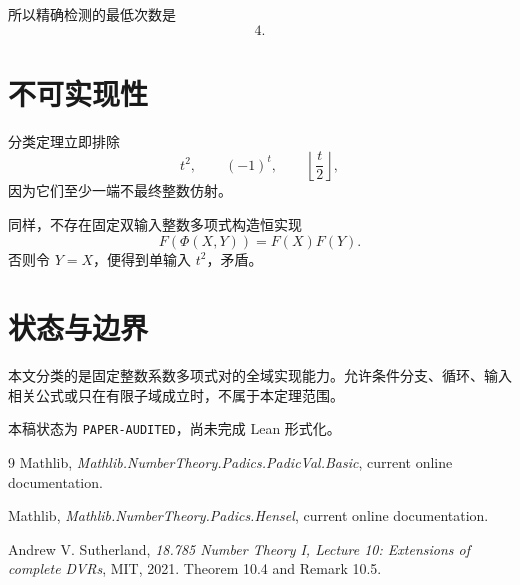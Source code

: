 \documentclass[11pt,a4paper]{ctexart}
\begin{document}
所以精确检测的最低次数是
\[
\boxed4.
\]

\section{不可实现性}
分类定理立即排除
\[
t^2,\qquad (-1)^t,\qquad \left\lfloor\frac t2\right\rfloor,
\]
因为它们至少一端不最终整数仿射。

同样，不存在固定双输入整数多项式构造恒实现
\[
F(\Phi(X,Y))=F(X)F(Y).
\]
否则令 \(Y=X\)，便得到单输入 \(t^2\)，矛盾。

\section{状态与边界}
本文分类的是固定整数系数多项式对的全域实现能力。允许条件分支、循环、输入相关公式或只在有限子域成立时，不属于本定理范围。

本稿状态为 \texttt{PAPER-AUDITED}，尚未完成 Lean 形式化。

\begin{thebibliography}{9}
Mathlib, \emph{Mathlib.NumberTheory.Padics.PadicVal.Basic}, current online documentation.

Mathlib, \emph{Mathlib.NumberTheory.Padics.Hensel}, current online documentation.

Andrew V. Sutherland, \emph{18.785 Number Theory I, Lecture 10: Extensions of complete DVRs}, MIT, 2021. Theorem 10.4 and Remark 10.5.
\end{thebibliography}
\end{document}
